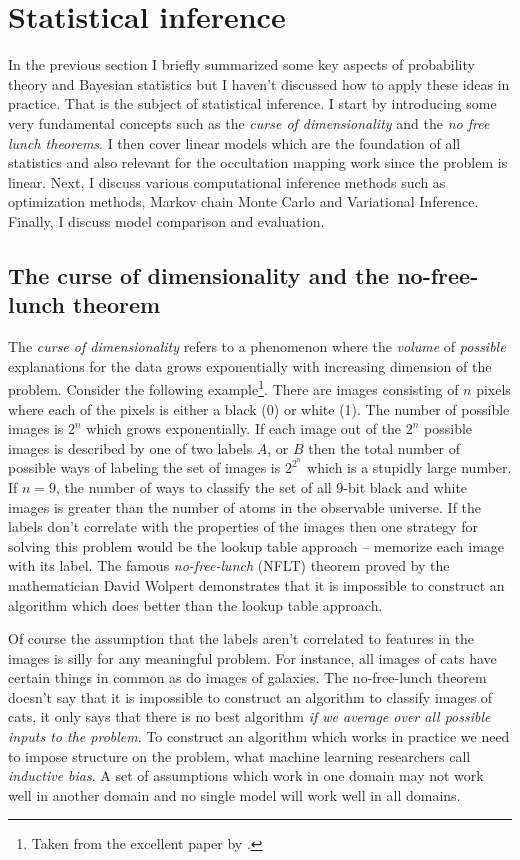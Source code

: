 \documentclass[12pt]{report}
\begin{document}
\section{Statistical inference}
\label{sec:inference_practice}
In the previous section I briefly summarized some key aspects of probability theory
and Bayesian statistics but I haven't discussed how to apply these ideas in practice. That
is the subject of statistical inference. I start by introducing some very fundamental
concepts such as the \emph{curse of dimensionality} and the \emph{no free lunch theorems}.
I then cover linear models which are the foundation of all statistics and also relevant
for the occultation mapping work since the problem is linear.
Next, I discuss various computational inference methods such
as optimization methods, Markov chain Monte Carlo and Variational Inference.
Finally, I discuss model comparison and evaluation.

\subsection{The curse of dimensionality and the no-free-lunch theorem}
The \emph{curse of dimensionality} refers to a phenomenon where the
\emph{volume} of \emph{possible} explanations for the data grows exponentially
with increasing dimension of the problem. Consider the following
example\footnote{ Taken from the excellent paper by \citet{arXiv:2104.00008}.
}. There are images consisting of $n$ pixels where each of the pixels is either
a black (0) or white (1). The number of possible images is $2^n$ which grows
exponentially. If each image out of the $2^n$ possible images is described by
one of two labels $A$, or $B$ then the total number of possible ways of
labeling the set of images is $2^{2^n}$ which is a stupidly large number. If
$n=9$, the number of ways to classify the set of all 9-bit black and white
images is greater than the number of atoms in the observable universe. If the
labels don't correlate with the properties of the images then one strategy for
solving this problem would be the lookup table approach -- memorize each image
with its label. The famous \emph{no-free-lunch} (NFLT) theorem proved by the
mathematician David Wolpert \citep{wolpert1996} demonstrates that it is
impossible to construct an algorithm which does better than the lookup table
approach.

Of course the assumption that the labels aren't correlated to features in the
images is silly for any meaningful problem. For instance, all images of cats
have certain things in common as do images of galaxies. The no-free-lunch
theorem doesn't say that it is impossible to construct an algorithm to classify
images of cats, it only says that there is no best algorithm \emph{if we
    average over all possible inputs to the problem}. To construct an algorithm
which works in practice we need to impose structure on the problem, what
machine learning researchers call \emph{inductive bias}. A set of assumptions
which work in one domain may not work well in another domain and no single
model will work well in all domains.
\end{document}
